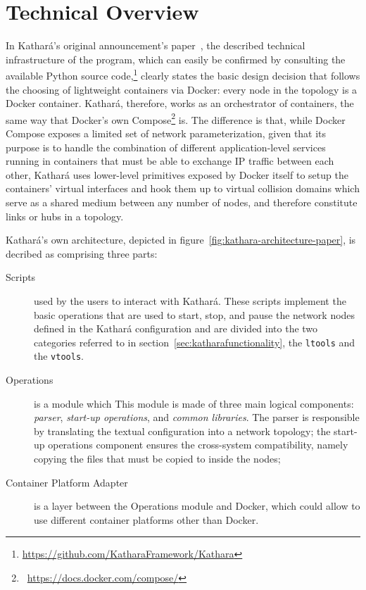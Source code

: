 \section{Technical Overview}
\label{sec:katharatechnicaloverview}

In Kathará's original announcement's paper~\cite{kathara}, the described technical infrastructure of the program, which can easily be confirmed by consulting the available Python source code,\footnote{\mbox{\url{https://github.com/KatharaFramework/Kathara}}} clearly states the basic design decision that follows the choosing of lightweight containers via Docker: every node in the topology is a Docker container.
Kathará, therefore, works as an orchestrator of containers, the same way that Docker's own Compose\footnote{~\mbox{\url{https://docs.docker.com/compose/}}} is.
The difference is that, while Docker Compose exposes a limited set of network parameterization, given that its purpose is to handle the combination of different application-level services running in containers that must be able to exchange IP traffic between each other, Kathará uses lower-level primitives exposed by Docker itself to setup the containers' virtual interfaces and hook them up to virtual collision domains which serve as a shared medium between any number of nodes, and therefore constitute links or hubs in a topology.



Kathará's own architecture, depicted in figure~\ref{fig:kathara-architecture-paper}, is decribed as comprising three parts:
\begin{description}
  \item[Scripts] used by the users to interact with Kathará.
  These scripts implement the basic operations that are used to start, stop, and pause the network nodes defined in the Kathará configuration and are divided into the two categories referred to in section~\ref{sec:katharafunctionality}, the \texttt{ltools} and the \texttt{vtools}.
  \item[Operations] is a module which 
  This module is made of three main logical components: \emph{parser}, \emph{start-up operations}, and \emph{common libraries}.
  The parser is responsible by translating the textual configuration into a network topology; the start-up operations component ensures the cross-system compatibility, namely copying the files that must be copied to inside the nodes;
  \item[Container Platform Adapter] is a layer between the Operations module and Docker, which could allow to use different container platforms other than Docker.
\end{description}

